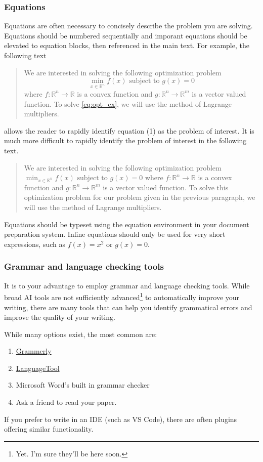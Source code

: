 \documentclass[]{article}
\begin{document}
\subsubsection{Equations}
Equations are often necessary to concisely describe the problem you are solving. Equations should be numbered sequentially and imporant equations should be elevated to equation blocks, then referenced in the main text. For example, the following text
\begin{quote}
    We are interested in solving the following optimization problem
    \begin{equation} \label{eq:opt_ex}
        \min_{x\in\mathbb{R}^n} f(x) \text{ subject to } g(x) = 0
    \end{equation}
    where $f:\mathbb{R}^n\to\mathbb{R}$ is a convex function and $g:\mathbb{R}^n\to\mathbb{R}^m$ is a vector valued function. To solve \eqref{eq:opt_ex}, we will use the method of Lagrange multipliers.
\end{quote}
allows the reader to rapidly identify equation (1) as the problem of interest. It is much more difficult to rapidly identify the problem of interest in the following text.
\begin{quote}
    We are interested in solving the following optimization problem
        $\min_{x\in\mathbb{R}^n} f(x) \text{ subject to } g(x) = 0$
    where $f:\mathbb{R}^n\to\mathbb{R}$ is a convex function and $g:\mathbb{R}^n\to\mathbb{R}^m$ is a vector valued function. To solve this optimization problem for our problem given in the previous paragraph, we will use the method of Lagrange multipliers.
\end{quote}
Equations should be typeset using the equation environment in your document preparation system. Inline equations should only be used for very short expressions, such as $f(x) = x^2$ or $g(x) = 0$.

\subsubsection{Grammar and language checking tools}

It is to your advantage to employ grammar and language checking tools. While broad AI tools are not sufficiently advanced\footnote{Yet. I'm sure they'll be here soon.} to automatically improve your writing, there are many tools that can help you identify grammatical errors and improve the quality of your writing.

While many options exist, the most common are:
\begin{enumerate}
    \item \href{https://www.grammarly.com/}{Grammerly}
    \item \href{https://languagetool.org/}{LanguageTool}
    \item Microsoft Word's built in grammar checker
    \item Ask a friend to read your paper.
\end{enumerate}
If you prefer to write in an IDE (such as VS Code), there are often plugins offering similar functionality.
\end{document}
